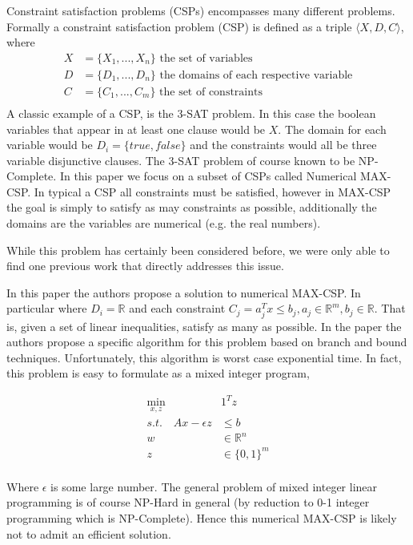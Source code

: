 \documentclass[a4paper]{article}
\begin{document}
Constraint satisfaction problems (CSPs) encompasses many different problems. Formally a 
constraint satisfaction problem (CSP) is defined as a triple $\langle X, D, C \rangle$, where 
\begin{align*}
	X &= \{X_1, ..., X_n\} \text{ the set of variables}\\
	D &= \{D_1, ..., D_n\} \text{ the domains of each respective variable}\\
	C &= \{C_1, ..., C_m\} \text{ the set of constraints}\\
\end{align*}
A classic example of a CSP, is the 3-SAT problem. In this case
the boolean variables that appear in at least one clause would be $X$. The domain for 
each variable would be $D_i = \{true, false\}$ and the constraints would all be 
three variable disjunctive clauses. The 3-SAT problem of course known to be NP-Complete.
In this paper we focus on a subset of CSPs called Numerical MAX-CSP. 
In typical a CSP all constraints must be satisfied, however in MAX-CSP the goal is simply to 
satisfy as may constraints as possible, additionally the domains are the variables 
are numerical (e.g. the real numbers). 

While this problem has certainly been considered before, we were only able to find one previous 
work that directly addresses this issue. 

In this paper the authors propose a solution to numerical MAX-CSP. In particular where 
$D_i = \mathds{R}$ and each constraint $C_j = a_j^Tx \leq b_j, a_j \in \mathds{R}^m, b_j \in \mathds{R}$. 
That is, given a set of linear inequalities, satisfy as many as possible. In the paper the authors 
propose a specific algorithm for this problem based on branch and bound techniques. Unfortunately, 
this algorithm is worst case exponential time. In fact, this problem is easy to formulate as a mixed integer 
program,

\begin{align*}
\min_{x,z}\quad &1^Tz\\
s.t. \quad Ax - \epsilon z &\leq b\\
		w &\in \mathds{R}^n\\
		z &\in \{0,1\}^m\\
\end{align*}

Where $\epsilon$ is some large number. The general problem of mixed integer linear programming is 
of course NP-Hard in general (by reduction to 0-1 integer programming which is NP-Complete). Hence 
this numerical MAX-CSP is likely not to admit an efficient solution. 
\end{document}
